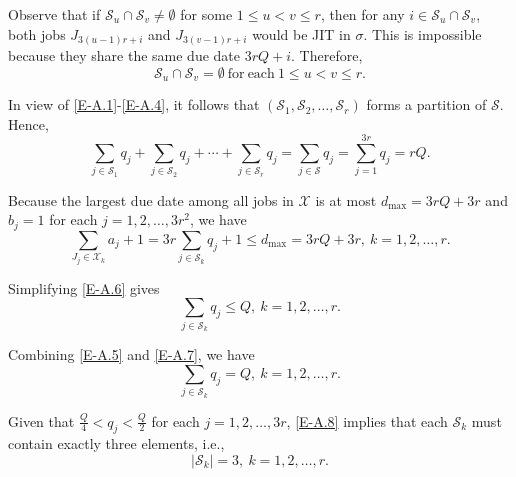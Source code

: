 \documentclass[12pt, eqno, limlimits]{article}
\begin{document}
\begin{sloppypar}
        Observe that if $\mathcal{S}_u \cap \mathcal{S}_v \not=\emptyset$ for some $1 \leq u < v \leq r$, then for any $i \in \mathcal{S}_u \cap \mathcal{S}_v$, both jobs $J_{3(u-1)r+i}$ and $J_{3(v-1)r+i}$ would be JIT  in $\sigma$. This is impossible because they share the same due date $3rQ+i$. Therefore,
        \begin{equation}\label{E-A.4}
            \mathcal{S}_u \cap \mathcal{S}_v=\emptyset ~\mathrm{for ~each} ~ 1 \leq u < v \leq r.
        \end{equation}
        
        In view of \eqref{E-A.1}-\eqref{E-A.4}, it follows that $(\mathcal{S}_1, \mathcal{S}_2, \ldots, \mathcal{S}_r)$ forms a partition of $\mathcal{S}$. Hence,
        \begin{equation}\label{E-A.5}
            \sum_{j \in \mathcal{S}_1} q_j + \sum_{j \in \mathcal{S}_2} q_j + \cdots + \sum_{j \in \mathcal{S}_r} q_j
            =\sum_{j \in \mathcal{S}} q_j=\sum_{j=1}^{3r} q_j=rQ.
        \end{equation}
        
        Because the largest due date among all jobs in $\mathcal{X}$ is at most $d_{\max}=3rQ+3r$ and $b_j=1$ for each $j=1, 2, \ldots, 3r^2$, we have
        \begin{equation}\label{E-A.6}
            \sum_{J_j \in \mathcal{X}_k} a_j+1 = 3r \sum_{j \in \mathcal{S}_k} q_j+1 \leq d_{\max}= 3rQ+3r, ~ k=1, 2, \ldots, r.
        \end{equation}
        
        Simplifying \eqref{E-A.6} gives
        \begin{equation}\label{E-A.7}
            \sum_{j \in \mathcal{S}_k} q_j \leq Q, ~ k=1, 2, \ldots, r.
        \end{equation}
        
        Combining \eqref{E-A.5} and \eqref{E-A.7}, we have 
        \begin{equation}\label{E-A.8}
            \sum_{j \in \mathcal{S}_k} q_j =Q, ~ k=1, 2, \ldots, r. 
        \end{equation}
        
        Given that $\frac{Q}{4} < q_j < \frac{Q}{2}$ for each $j=1, 2, \ldots, 3r$, \eqref{E-A.8} implies that each $\mathcal{S}_k$ must contain exactly three elements, i.e., 
        \begin{equation}\label{E-A.9}
            |\mathcal{S}_k|=3, ~ k=1, 2, \ldots, r.
        \end{equation}	
        

\end{sloppypar}
\end{document}
